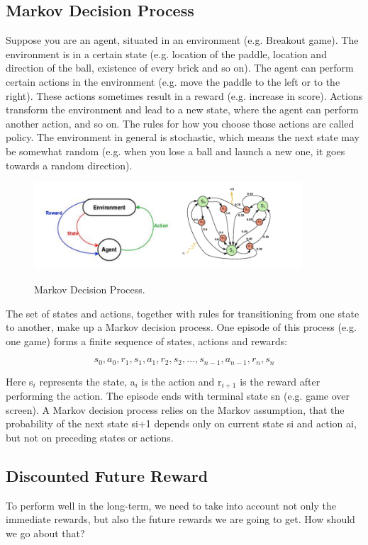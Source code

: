 \documentclass[a4paper,11pt]{report}
\begin{document}
			\subsection{Markov Decision Process}
				Suppose you are an agent, situated in an environment (e.g. Breakout game). The environment is in a certain state (e.g. location of the paddle, location and direction of the ball, existence of every brick and so on). The agent can perform certain actions in the environment (e.g. move the paddle to the left or to the right). These actions sometimes result in a reward (e.g. increase in score). Actions transform the environment and lead to a new state, where the agent can perform another action, and so on. The rules for how you choose those actions are called policy. The environment in general is stochastic, which means the next state may be somewhat random (e.g. when you lose a ball and launch a new one, it goes towards a random direction).
				\begin{figure}[!ht]
					\begin{centering}
						\includegraphics[width=10cm]{../Design/images/mdp.png}\\
						\caption{Markov Decision Process.}
					\end{centering}
				\end{figure}

				The set of states and actions, together with rules for transitioning from one state to another, make up a Markov decision process. One episode of this process (e.g. one game) forms a finite sequence of states, actions and rewards:

				\[ s_0,a_0,r_1,s_1,a_1,r_2,s_2, ... ,s_{n-1},a_{n-1},r_n,s_n\]

				Here s$_{i}$ represents the state, a$_i$ is the action and r$_{i+1}$ is the reward after performing the action. The episode ends with terminal state sn (e.g. game over screen). A Markov decision process relies on the Markov assumption, that the probability of the next state si+1 depends only on current state si and action ai, but not on preceding states or actions.
			\subsection{Discounted Future Reward}
				To perform well in the long-term, we need to take into account not only the immediate rewards, but also the future rewards we are going to get. How should we go about that?
\end{document}
